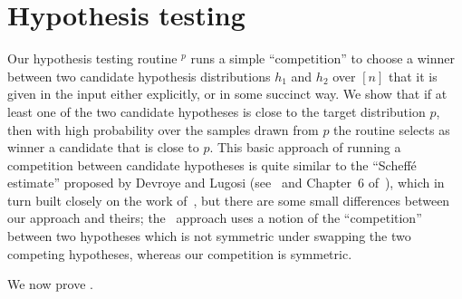 \section{Hypothesis testing} \label{sec:choosehypothesis}

Our hypothesis testing routine $^p$ runs a simple ``competition'' to choose a winner between two candidate hypothesis distributions $h_1$ and $h_2$  over $[n]$ that it is given in the input either explicitly, or in some succinct way.  We show that if at least one of the two candidate hypotheses is close to the target distribution $p$, then with high probability over the samples drawn from $p$ the routine selects as winner a candidate that is close to $p$.
  This basic approach of running a competition between candidate hypotheses is quite similar to the ``Scheff\'e estimate'' proposed by Devroye and Lugosi (see~\cite{DL96,DL97}
and Chapter~6 of~\cite{DL:01}), which in turn built closely on the work of~\cite{Yatracos85}, but
there are some small differences between our approach and theirs; the~\cite{DL:01} approach uses a notion of the ``competition'' between two hypotheses which is not symmetric under swapping the two competing hypotheses, whereas our competition is {symmetric}.
%

We now prove .

